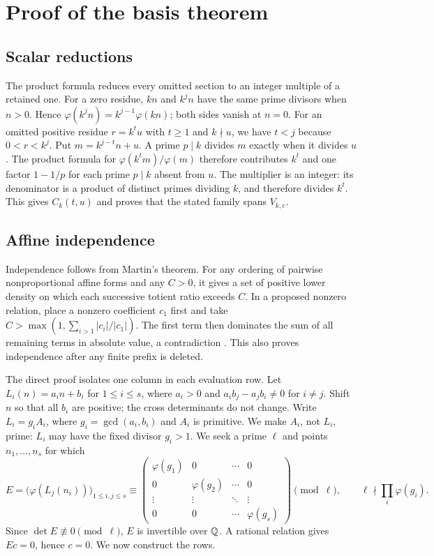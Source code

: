 \documentclass[11pt]{article}
\begin{document}
\section{Proof of the basis theorem}\label{sec:rank}
\subsection*{Scalar reductions}
The product formula reduces every omitted section to an integer
multiple of a retained one.
For a zero residue, $kn$ and $k^jn$ have the same prime divisors when
$n>0$. Hence
$\varphi(k^jn)=k^{j-1}\varphi(kn)$; both sides vanish at $n=0$.
For an omitted positive residue $r=k^tu$ with $t\ge1$ and $k\nmid u$,
we have $t<j$ because $0<r<k^j$. Put $m=k^{j-t}n+u$. A prime $p\mid k$ divides $m$ exactly when it divides
$u$. The product formula for $\varphi(k^tm)/\varphi(m)$ therefore
contributes $k^t$ and one factor $1-1/p$ for each prime $p\mid k$
absent from $u$. The multiplier is an integer: its denominator is a
product of distinct primes dividing $k$, and therefore divides $k^t$.
This gives $C_k(t,u)$ and proves that the stated family spans $V_{k,e}$.

\subsection*{Affine independence}
Independence follows from Martin's theorem. For any ordering of
pairwise nonproportional affine forms and any $C>0$, it gives a set
of positive lower density on which each successive totient ratio
exceeds $C$. In a proposed nonzero relation, place a nonzero
coefficient $c_1$ first and take
$C>\max(1,\sum_{i>1}|c_i|/|c_1|)$. The first term then dominates
the sum of all remaining terms in absolute value, a contradiction
\cite[Thm.~1]{martin-phi-inequalities}. This also proves independence
after any finite prefix is deleted.

The direct proof isolates one column in each evaluation row. Let
$L_i(n)=a_i n+b_i$ for $1\le i\le s$, where $a_i>0$ and
$a_i b_j-a_j b_i\ne0$ for $i\ne j$. Shift $n$ so that all $b_i$
are positive; the cross determinants do not change. Write
$L_i=g_iA_i$, where $g_i=\gcd(a_i,b_i)$ and $A_i$ is primitive.
We make $A_i$, not $L_i$, prime: $L_i$ may have the fixed divisor
$g_i>1$. We seek a prime $\ell$ and points $n_1,\ldots,n_s$ for which
\begin{equation}\label{eq:diagonal-evaluation}
 E=\bigl(\varphi(L_j(n_i))\bigr)_{1\le i,j\le s}
 \equiv
 \begin{pmatrix}
 \varphi(g_1)&0&\cdots&0\\
 0&\varphi(g_2)&\cdots&0\\
 \vdots&\vdots&\ddots&\vdots\\
 0&0&\cdots&\varphi(g_s)
 \end{pmatrix}\pmod\ell,
 \qquad \ell\nmid\prod_i\varphi(g_i).
\end{equation}
Since $\det E\not\equiv0\pmod\ell$, $E$ is invertible over $\mathbb{Q}$.
A rational relation gives $Ec=0$, hence $c=0$. We now construct
the rows.
\end{document}
